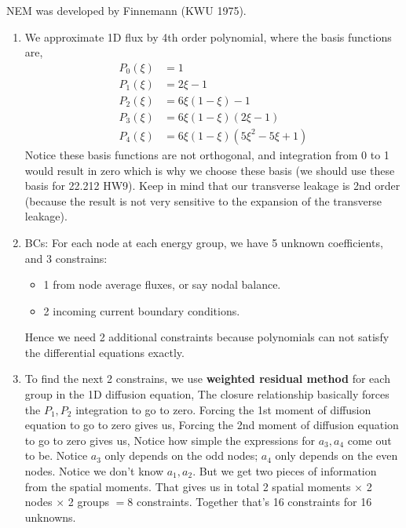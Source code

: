 \documentclass{school-22.211-notes}
\begin{document}
\clearpage
{}
NEM was developed by Finnemann (KWU 1975). 
  \begin{enumerate}
  \item We approximate 1D flux by 4th order polynomial, 
    where the basis functions are, 
    \begin{align}
      P_0(\xi) &= 1 \\
      P_1(\xi) &= 2 \xi - 1\\
      P_2(\xi) &= 6 \xi (1-\xi) - 1 \\
      P_3(\xi) &= 6 \xi (1-\xi)(2\xi-1) \\
      P_4(\xi) &= 6 \xi (1-\xi)(5\xi^2 -5\xi +1)
    \end{align}
    Notice these basis functions are not orthogonal, and integration from 0 to 1 would result in zero which is why we choose these basis (we should use these basis for 22.212 HW9). Keep in mind that our transverse leakage is 2nd order (because the result is not very sensitive to the expansion of the transverse leakage). 

  \item BCs: For each node at each energy group, we have 5 unknown coefficients, and 3 constrains:
    \begin{itemize}
      \item 1 from node average fluxes, or say nodal balance. 
      \item 2 incoming current boundary conditions. 
    \end{itemize}
    Hence we need 2 additional constraints because polynomials can not satisfy the differential equations exactly. 

  \item To find the next 2 constrains, we use \textbf{weighted residual method} for each group in the 1D diffusion equation, 
    The closure relationship basically forces the $P_1, P_2$ integration to go to zero. Forcing the 1st moment of diffusion equation to go to zero gives us, 
    Forcing the 2nd moment of diffusion equation to go to zero gives us, 
    Notice how simple the expressions for $a_3, a_4$ come out to be. Notice $a_3$ only depends on the odd nodes; $a_4$ only depends on the even nodes. Notice we don't know $a_1, a_2$. But we get two pieces of information from the spatial moments. That gives us in total 2 spatial moments $\times$ 2 nodes $\times$ 2 groups $= 8$ constraints. Together that's 16 constraints for 16 unknowns. 


\end{enumerate}
\end{document}
